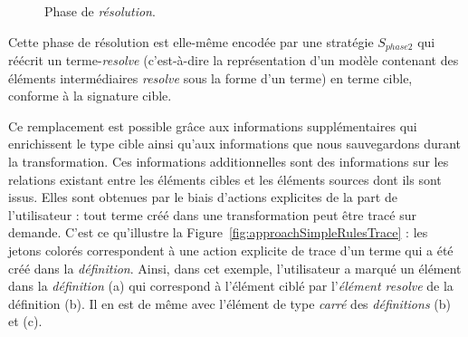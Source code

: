 %   

\begin{figure}[h]
  \begin{center}
   
   \caption{Phase de \emph{résolution}.}
    \label{fig:approachResolutionPhase2}
  \end{center}
\end{figure}

Cette phase de résolution est elle-même encodée par une stratégie $S_{phase2}$
qui réécrit un terme-\emph{resolve} (c'est-à-dire la représentation d'un modèle
contenant des éléments intermédiaires \emph{resolve} sous la forme d'un terme)
en terme cible, conforme à la signature cible.

Ce remplacement est possible grâce aux informations supplémentaires qui
enrichissent le type cible ainsi qu'aux informations que nous sauvegardons
durant la transformation. Ces informations additionnelles sont des informations
sur les relations existant entre les éléments cibles et les éléments sources
dont ils sont issus. Elles sont obtenues par le biais d'actions explicites de
la part de l'utilisateur : tout terme créé dans une transformation peut être
tracé sur demande. C'est ce qu'illustre la
Figure~\ref{fig:approachSimpleRulesTrace} : les jetons colorés correspondent à
une action explicite de trace d'un terme qui a été créé dans la
\emph{définition}. Ainsi, dans cet exemple, l'utilisateur a marqué un élément
dans la \emph{définition} (a) qui correspond à l'élément ciblé par
l'\emph{élément resolve} de la définition (b). Il en est de même avec l'élément
de type \emph{carré} des \emph{définitions} (b) et (c).

